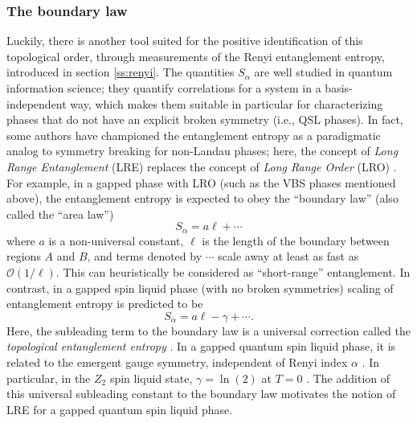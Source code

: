 \documentclass[range]{ar2e}
\begin{document}
\subsubsection{The boundary law}
Luckily, there is another tool suited for the positive identification of this topological order, through measurements of the Renyi entanglement entropy, introduced in section \ref{ss:renyi}.  The quantities $S_{\alpha}$ are well studied in quantum information science; they quantify correlations for a system in a basis-independent way, which makes them suitable in particular for characterizing phases that do not have an explicit broken symmetry (i.e., QSL phases).  In fact, some authors have championed the entanglement entropy as a paradigmatic analog to symmetry breaking for non-Landau phases; here, the concept of {\it Long Range Entanglement} (LRE) replaces the concept of {\it Long Range Order} (LRO) \cite{Wenbook}.  For example, in a gapped phase with LRO (such as the VBS phases mentioned above), the entanglement entropy is expected to obey the ``boundary law'' (also called the ``area law'')
\begin{equation} 
S_{\alpha} = a\ell + \cdots \label{arealaw}
\end{equation}
where $a$ is a non-universal constant, $\ell$ is the length of the boundary between regions $A$ and $B$, and terms denoted by $\cdots$ scale away at least as fast as $\mathcal{O} (1/\ell)$.  This can heuristically be considered as ``short-range'' entanglement.  In contrast, in a gapped spin liquid phase (with no broken symmetries)
scaling of entanglement entropy is predicted to be
\begin{equation}
S_{\alpha} = a \ell - \gamma + \cdots \label{areaL}.
\end{equation}
 Here, the subleading term to the boundary law is a universal correction called the {\it topological entanglement entropy} \cite{Alioscia1,Alioscia2,LW,KP}.  In a gapped quantum spin liquid phase, it is related to the emergent gauge symmetry, independent of Renyi index $\alpha$ \cite{Flammia}.  In particular, in the $Z_2$ spin liquid state, $\gamma =  \ln(2)$ at $T=0$ \cite{LW}.   The addition of this universal subleading constant to the boundary law motivates the notion of LRE for a gapped quantum spin liquid phase.
\end{document}
